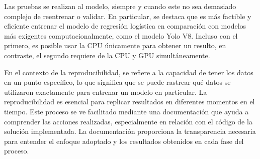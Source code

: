 Las pruebas se realizan al modelo, siempre y cuando este no sea demasiado complejo de reentrenar o validar. En particular, se destaca que es más factible y eficiente entrenar el modelo de regresión logística en comparación con modelos más exigentes computacionalmente, como el modelo Yolo V8. Incluso con el primero, es posible usar la CPU únicamente para obtener un resulto, en contraste, el segundo requiere de la CPU y GPU simultáneamente. \newline

\newpage

En el contexto de la reproducibilidad, se refiere a la capacidad de tener los datos en un punto específico, lo que significa que se puede rastrear qué datos se utilizaron exactamente para entrenar un modelo en particular. La reproducibilidad es esencial para replicar resultados en diferentes momentos en el tiempo. Este proceso se ve facilitado mediante una documentación que ayuda a comprender las acciones realizadas, especialmente en relación con el código de la solución implementada. La documentación proporciona la transparencia necesaria para entender el enfoque adoptado y los resultados obtenidos en cada fase del proceso.

